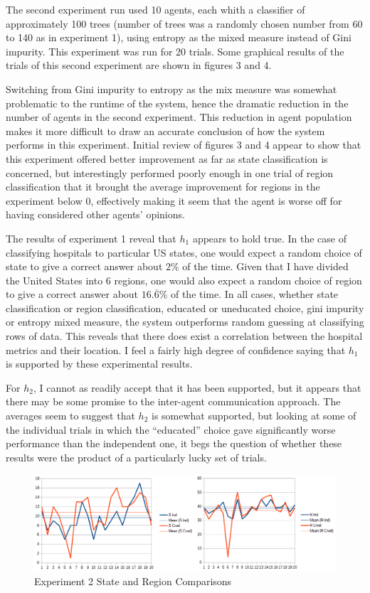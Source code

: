 \documentclass{article}
\begin{document}
\par The second experiment run used 10 agents, each whith a classifier of approximately 100 trees (number of trees was a randomly chosen number from 60 to 140 as in experiment 1), using entropy as the mixed measure instead of Gini impurity. This experiment was run for 20 trials. Some graphical results of the trials of this second experiment are shown in figures 3 and 4.
\par Switching from Gini impurity to entropy as the mix measure was somewhat problematic to the runtime of the system, hence the dramatic reduction in the number of agents in the second experiment. This reduction in agent population makes it more difficult to draw an accurate conclusion of how the system performs in this experiment. Initial review of figures 3 and 4 appear to show that this experiment offered better improvement as far as state classification is concerned, but interestingly performed poorly enough in one trial of region classification that it brought the average improvement for regions in the experiment below 0, effectively making it seem that the agent is worse off for having considered other agents' opinions.
\par The results of experiment 1 reveal that $h_{1}$ appears to hold true. In the case of classifying hospitals to particular US states, one would expect a random choice of state to give a correct answer about $2\%$ of the time. Given that I have divided the United States into 6 regions, one would also expect a random choice of region to give a correct answer about $16.\overline{6}\%$ of the time. In all cases, whether state classification or region classification, educated or uneducated choice, gini impurity or entropy mixed measure, the system outperforms random guessing at classifying rows of data. This reveals that there does exist a correlation between the hospital metrics and their location. I feel a fairly high degree of confidence saying that $h_{1}$ is supported by these experimental results.
\par For $h_{2}$, I cannot as readily accept that it has been supported, but it appears that there may be some promise to the inter-agent communication approach. The averages seem to suggest that $h_{2}$ is somewhat supported, but looking at some of the individual trials in which the ``educated'' choice gave significantly worse performance than the independent one, it begs the question of whether these results were the product of a particularly lucky set of trials.

\begin{figure}[H]
	\includegraphics[width=\textwidth]{e2_comparative}
	\caption{Experiment 2 State and Region Comparisons}
\end{figure}
\end{document}
